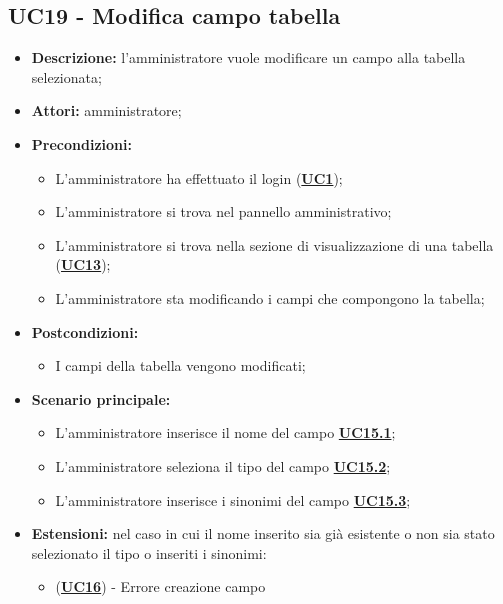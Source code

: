 \subsection{UC19 - Modifica campo tabella}
\label{sec:UC19}
\begin{itemize}
	\item \textbf{Descrizione:} l’amministratore vuole modificare un campo alla tabella selezionata;
	\item \textbf{Attori:} amministratore;
	\item \textbf{Precondizioni:} 
	\begin{itemize}
		\item L’amministratore ha effettuato il login (\hyperref[sec:UC1]{\textbf{UC1}});
		\item L’amministratore si trova nel pannello amministrativo;
		\item L’amministratore si trova nella sezione di visualizzazione di una tabella (\hyperref[sec:UC13]{\textbf{UC13}});
		\item L’amministratore sta modificando i campi che compongono la tabella;
	\end{itemize}
	\item \textbf{Postcondizioni:} 
	\begin{itemize}
		\item I campi della tabella vengono modificati;
	\end{itemize}
	\item \textbf{Scenario principale:} 
	\begin{itemize}
		\item L’amministratore inserisce il nome del campo \hyperref[sec:UC15.1]{\textbf{UC15.1}};
		\item L'amministratore seleziona il tipo del campo \hyperref[sec:UC15.2]{\textbf{UC15.2}};
		\item L'amministratore inserisce i sinonimi del campo \hyperref[sec:UC15.3]{\textbf{UC15.3}};
	\end{itemize}

		\item \textbf{Estensioni:} nel caso in cui il nome inserito sia già esistente o non sia stato selezionato il tipo o inseriti i sinonimi:
		\begin{itemize}
			\item (\hyperref[sec:UC16]{\textbf{UC16}}) - Errore creazione campo
	\end{itemize}
\end{itemize}


